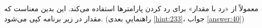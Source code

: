 \section{}
\paragraph{}\label{hint:159}
معمولاً  از «رد با مقدار» برای رد کردن پارامترها استفاده می‌کند. این بدین معناست که مقدار در زیر برنامه کپی می‌شود. (راهنماییِ بعدی \ref{hint:233}، جواب \ref{answer:40})